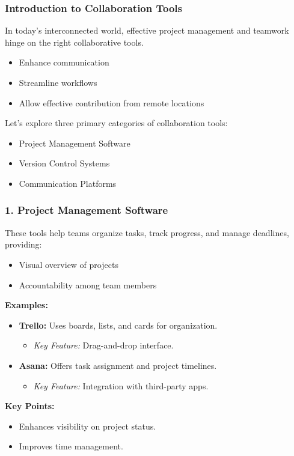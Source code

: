 \documentclass[aspectratio=169]{beamer}
\begin{document}
\begin{frame}[fragile]
    \frametitle{Introduction to Collaboration Tools}
    In today's interconnected world, effective project management and teamwork hinge on the right collaborative tools. 
    \begin{itemize}
        \item Enhance communication
        \item Streamline workflows
        \item Allow effective contribution from remote locations
    \end{itemize}
    Let’s explore three primary categories of collaboration tools: 
    \begin{itemize}
        \item Project Management Software
        \item Version Control Systems
        \item Communication Platforms
    \end{itemize}
\end{frame}

\begin{frame}[fragile]
    \frametitle{1. Project Management Software}
    These tools help teams organize tasks, track progress, and manage deadlines, providing:
    \begin{itemize}
        \item Visual overview of projects
        \item Accountability among team members
    \end{itemize}
    \textbf{Examples:}
    \begin{itemize}
        \item \textbf{Trello:} Uses boards, lists, and cards for organization.
        \begin{itemize}
            \item \textit{Key Feature:} Drag-and-drop interface.
        \end{itemize}
        \item \textbf{Asana:} Offers task assignment and project timelines.
        \begin{itemize}
            \item \textit{Key Feature:} Integration with third-party apps.
        \end{itemize}
    \end{itemize}
    \textbf{Key Points:}
    \begin{itemize}
        \item Enhances visibility on project status.
        \item Improves time management.
    \end{itemize}
\end{frame}
\end{document}
